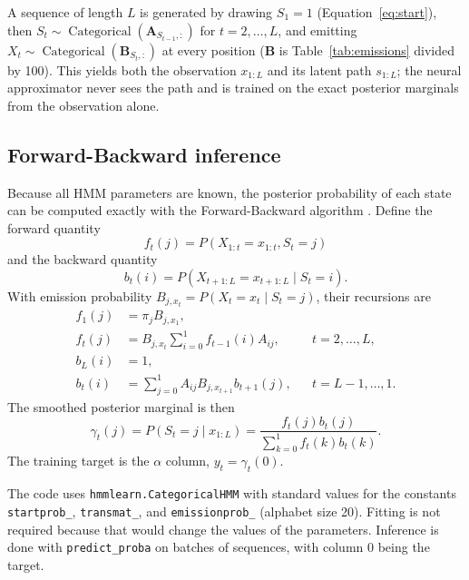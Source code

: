 \documentclass[12pt]{article}
\begin{document}
A sequence of length $L$ is generated by drawing $S_1=1$
(Equation~\ref{eq:start}), then $S_t\sim\operatorname{Categorical}
(\mathbf{A}_{S_{t-1},:})$ for $t=2,\ldots,L$, and emitting
$X_t\sim\operatorname{Categorical}(\mathbf{B}_{S_t,:})$ at every position
($\mathbf{B}$ is Table~\ref{tab:emissions} divided by 100). This yields both
the observation $x_{1:L}$ and its latent path $s_{1:L}$; the neural
approximator never sees the path and is trained on the exact posterior
marginals from the observation alone.

\subsection{Forward-Backward inference}

Because all HMM parameters are known, the posterior probability of each state can be
computed exactly with the Forward-Backward algorithm \parencite{jurafsky}. Define the
forward quantity
\begin{equation}
f_t(j)=P(X_{1:t}=x_{1:t},S_t=j)
\end{equation}
and the backward quantity
\begin{equation}
b_t(i)=P(X_{t+1:L}=x_{t+1:L}\mid S_t=i).
\end{equation}
With emission probability $B_{j,x_t}=P(X_t=x_t\mid S_t=j)$, their recursions are
\begin{align}
f_1(j) &= \pi_j B_{j,x_1}, \\
f_t(j) &= B_{j,x_t}\sum_{i=0}^{1} f_{t-1}(i)A_{ij},
          &&t=2,\ldots,L, \\
b_L(i) &= 1, \\
b_t(i) &= \sum_{j=0}^{1}A_{ij}B_{j,x_{t+1}}b_{t+1}(j),
          &&t=L-1,\ldots,1.
\end{align}
The smoothed posterior marginal is then
\begin{equation}
\gamma_t(j)
=P(S_t=j\mid x_{1:L})
=\frac{f_t(j)b_t(j)}{\sum_{k=0}^{1}f_t(k)b_t(k)}.
\label{eq:gamma}
\end{equation}
The training target is the $\alpha$ column, $y_t=\gamma_t(0)$.

The code uses \texttt{hmmlearn.CategoricalHMM} \parencite{hmmlearn} with standard values for the constants \texttt{startprob\_}, \texttt{transmat\_}, and \texttt{emissionprob\_} (alphabet size 20). Fitting is not required because that would change the values of the parameters. Inference is done with \texttt{predict\_proba} on batches of sequences, with column 0 being the target.
\end{document}
